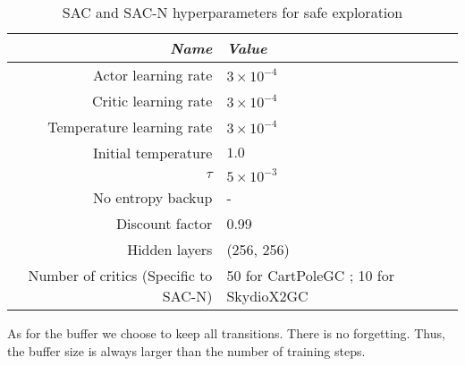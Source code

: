\begin{table}[th]
	\caption{SAC and SAC-N hyperparameters for safe exploration}
	\label{tab:sac_sac_n}
	\begin{tabular}{rll}
    \toprule
		\textit{Name} & \textit{Value} \\ \midrule
		Actor learning rate & $3\times 10^{-4}$  \\
		Critic learning rate & $3\times 10^{-4}$ \\
		Temperature learning rate & $3\times 10^{-4}$ \\
    Initial temperature & $1.0$ \\
    $\tau$ & $5\times 10^{-3}$ \\
		No entropy backup & -  \\
		Discount factor & 0.99  \\ 
    Hidden layers & (256, 256) \\
    Number of critics (Specific to SAC-N) & 50 for CartPoleGC ; 10 for SkydioX2GC \\
    \bottomrule
	\end{tabular}
\end{table}

As for the buffer we choose to keep all transitions. There is no forgetting. 
Thus, the buffer size is always larger than the number of training steps.

